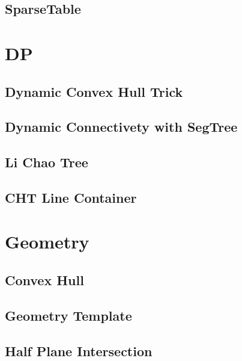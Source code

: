 \subsection{SparseTable}
\raggedbottom
\hrulefill

\section{DP}
\subsection{Dynamic Convex Hull Trick}
\raggedbottom
\hrulefill
\subsection{Dynamic Connectivety with SegTree}
\raggedbottom
\hrulefill
\subsection{Li Chao Tree}
\raggedbottom
\hrulefill
\subsection{CHT Line Container}
\raggedbottom
\hrulefill

\section{Geometry}
\subsection{Convex Hull}
\raggedbottom
\hrulefill
\subsection{Geometry Template}
\raggedbottom
\hrulefill
\subsection{Half Plane Intersection}
\raggedbottom
\hrulefill
